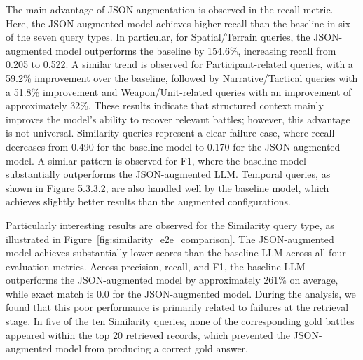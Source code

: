 The main advantage of JSON augmentation is observed in the recall metric. Here, the JSON-augmented model achieves higher recall than the baseline in six of the seven query types. In particular, for Spatial/Terrain queries, the JSON-augmented model outperforms the baseline by 154.6\%, increasing recall from 0.205 to 0.522. A similar trend is observed for Participant-related queries, with a 59.2\% improvement over the baseline, followed by Narrative/Tactical queries with a 51.8\% improvement and Weapon/Unit-related queries with an improvement of approximately 32\%. These results indicate that structured context mainly improves the model’s ability to recover relevant battles; however, this advantage is not universal. Similarity queries represent a clear failure case, where recall decreases from 0.490 for the baseline model to 0.170 for the JSON-augmented model. A similar pattern is observed for F1, where the baseline model substantially outperforms the JSON-augmented LLM. Temporal queries, as shown in Figure 5.3.3.2, are also handled well by the baseline model, which achieves slightly better results than the augmented configurations.

Particularly interesting results are observed for the Similarity query type, as illustrated in Figure~\ref{fig:similarity_e2e_comparison}. The JSON-augmented model achieves substantially lower scores than the baseline LLM across all four evaluation metrics. Across precision, recall, and F1, the baseline LLM outperforms the JSON-augmented model by approximately 261\% on average, while exact match is 0.0 for the JSON-augmented model. During the analysis, we found that this poor performance is primarily related to failures at the retrieval stage. In five of the ten Similarity queries, none of the corresponding gold battles appeared within the top 20 retrieved records, which prevented the JSON-augmented model from producing a correct gold answer.

